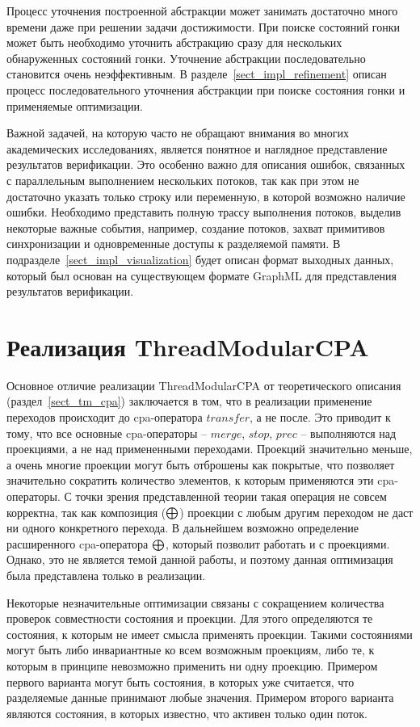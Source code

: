 Процесс уточнения построенной абстракции может занимать достаточно много времени даже при решении задачи достижимости.
При поиске состояний гонки может быть необходимо уточнить абстракцию сразу для нескольких обнаруженных состояний гонки.
Уточнение абстракции последовательно становится очень неэффективным.
В разделе~\ref{sect_impl_refinement} описан процесс последовательного уточнения абстракции при поиске состояния гонки и применяемые оптимизации.

Важной задачей, на которую часто не обращают внимания во многих академических исследованиях, является понятное и наглядное представление результатов верификации.
Это особенно важно для описания ошибок, связанных с параллельным выполнением нескольких потоков, так как при этом не достаточно указать только строку или переменную, в которой возможно наличие ошибки.
Необходимо представить полную трассу выполнения потоков, выделив некоторые важные события, например, создание потоков, захват примитивов синхронизации и одновременные доступы к разделяемой памяти.
В подразделе~\ref{sect_impl_visualization} будет описан формат выходных данных, который был основан на существующем формате GraphML для представления результатов верификации.

\section{Реализация ThreadModularCPA}
\label{sect_impl_tm}

Основное отличие реализации ThreadModularCPA от теоретического описания (раздел~\ref{sect_tm_cpa}) заключается в том, что в реализации применение переходов происходит до cpa-оператора $transfer$, а не после. 
Это приводит к тому, что все основные cpa-операторы -- $merge$, $stop$, $prec$ -- выполняются над проекциями, а не над примененными переходами.
Проекций значительно меньше, а очень многие проекции могут быть отброшены как покрытые, что позволяет значительно сократить количество элементов, к которым применяются эти cpa-операторы.
С точки зрения представленной теории такая операция не совсем корректна, так как композиция ($\mathrel{\bigoplus}$) проекции с любым другим переходом не даст ни одного конкретного перехода. 
В дальнейшем возможно определение расширенного cpa-оператора $\mathrel{\bigoplus}$, который позволит работать и с проекциями.
Однако, это не является темой данной работы, и поэтому данная оптимизация была представлена только в реализации.

Некоторые незначительные оптимизации связаны с сокращением количества проверок совместности состояния и проекции. 
Для этого определяются те состояния, к которым не имеет смысла применять проекции.
Такими состояниями могут быть либо инвариантные ко всем возможным проекциям, либо те, к которым в принципе невозможно применить ни одну проекцию.
Примером первого варианта могут быть состояния, в которых уже считается, что разделяемые данные принимают любые значения.
Примером второго варианта являются состояния, в которых известно, что активен только один поток.

